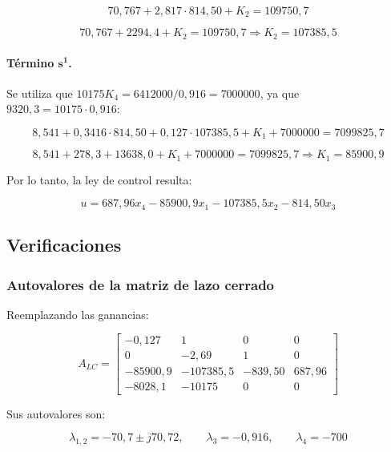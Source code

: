 \documentclass[12pt,a4paper]{article}
\begin{document}
\begin{equation}70{,}767+2{,}817\cdot814{,}50+K_2=109750{,}7\end{equation}

\begin{equation}70{,}767+2294{,}4+K_2=109750{,}7\Rightarrow\boxed{K_2=107385{,}5}\end{equation}
\paragraph{Término $\boldsymbol{s^1}$.} Se utiliza que $10175K_4=6412000/0{,}916=7000000$, ya que $9320{,}3=10175\cdot0{,}916$:

\begin{equation}8{,}541+0{,}3416\cdot814{,}50+0{,}127\cdot107385{,}5+K_1+7000000=7099825{,}7\end{equation}

\begin{equation}8{,}541+278{,}3+13638{,}0+K_1+7000000=7099825{,}7\Rightarrow\boxed{K_1=85900{,}9}\end{equation}

Por lo tanto, la ley de control resulta:

\begin{equation}\boxed{u=687{,}96x_4-85900{,}9x_1-107385{,}5x_2-814{,}50x_3}\end{equation}
\subsection*{Verificaciones}
\subsubsection*{Autovalores de la matriz de lazo cerrado}
Reemplazando las ganancias:

\begin{equation}A_{LC}=\begin{bmatrix}-0{,}127&1&0&0\\0&-2{,}69&1&0\\-85900{,}9&-107385{,}5&-839{,}50&687{,}96\\-8028{,}1&-10175&0&0\end{bmatrix}\end{equation}

Sus autovalores son:

\begin{equation}\boxed{\lambda_{1,2}=-70{,}7\pm j70{,}72,\qquad \lambda_3=-0{,}916,\qquad \lambda_4=-700}\end{equation}
\end{document}
